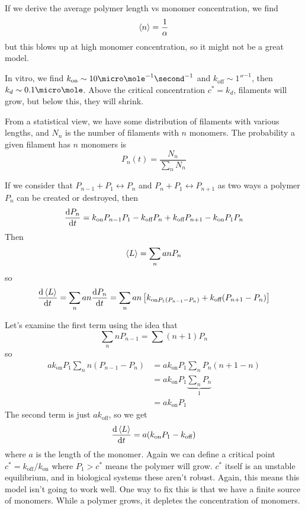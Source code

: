\documentclass[a4paper,twoside,master.tex]{subfiles}
\begin{document}
If we derive the average polymer length vs monomer concentration, we find
\begin{equation}
    \ev{n} = \frac{1}{\alpha}
\end{equation}
but this blows up at high monomer concentration, so it might not be a great model.

In vitro, we find $ k_{\text{on}} \sim 10 \micro\mole^{-1} \second^{-1} $ and $ k_{\text{off}} \sim 1 \second^{-1} $, then $ k_d \sim 0.1\micro\mole $. Above the critical concentration $ c^* = k_d $, filaments will grow, but below this, they will shrink.

From a statistical view, we have some distribution of filaments with various lengths, and $ N_n $ is the number of filaments with $ n $ monomers. The probability a given filament has $ n $ monomers is
\begin{equation}
    P_n(t) = \frac{N_n}{\sum_n N_n}
\end{equation}

If we consider that $ P_{n-1} + P_1 \leftrightarrow P_n $ and $ P_n + P_1 \leftrightarrow P_{n+1} $ as two ways a polymer $ P_n $ can be created or destroyed, then
\begin{equation}
    \dv{P_n}{t} = k_{\text{on}} P_{n-1} P_1 - k_{\text{off}} P_n + k_{\text{off}} P_{n+1} - k_{\text{on}} P_1 P_n
\end{equation}
Then
\begin{equation}
    \ev{L} = \sum_n a n P_n
\end{equation}
so
\begin{equation}
    \dv{\ev{L}}{t}= \sum_n a n \dv{P_n}{t} = \sum_n a n \left[ k_{\text{on} P_1 (P_{n-1} - P_n)} + k_{\text{off}} (P_{n+1} - P_n) \right]
\end{equation}

Let's examine the first term using the idea that
\begin{equation}
    \sum_n n P_{n-1} = \sum (n+1) P_n
\end{equation}
so
\begin{align}
    a k_{\text{on}} P_1 \sum_n n (P_{n-1} - P_n) &= a k_{\text{on}} P_1 \sum_n P_n (n + 1 - n) \\
                                                 &= a k_{\text{on}} P_1 \underbrace{\sum_n P_n}_{1} \\
                                                 &= a k_{\text{on}} P_1
\end{align}
The second term is just $ a k_{\text{off}} $, so we get
\begin{equation}
    \dv{\ev{L}}{t} = a (k_{\text{on}} P_1 - k_{\text{off}})
\end{equation}
where $ a $ is the length of the monomer. Again we can define a critical point $ c^* = k_{\text{off}} / k_{\text{on}} $ where $ P_1 > c^* $ means the polymer will grow. $ c^* $ itself is an unstable equilibrium, and in biological systems these aren't robust. Again, this means this model isn't going to work well. One way to fix this is that we have a finite source of monomers. While a polymer grows, it depletes the concentration of monomers.
\end{document}
